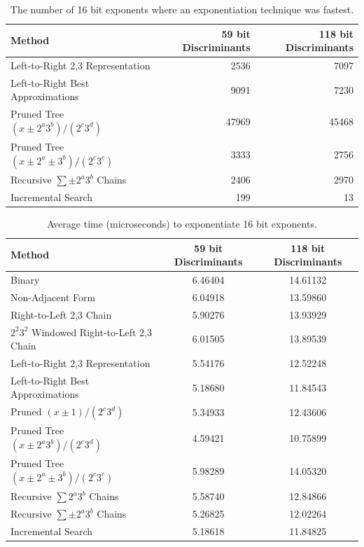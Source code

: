 \documentclass{ucalgthes1}
\theoremstyle{definition}
\begin{document}
\begin{table}[htb]
\centering
\begin{tabular}{| l | r | r |}
	\hline
	Method & 59 bit Discriminants & 118 bit Discriminants \\
	\hline
	Left-to-Right 2,3 Representation & 2536 & 7097 \\
	Left-to-Right Best Approximations & 9091 & 7230 \\
	Pruned Tree $(x \pm 2^a3^b)/(2^c3^d)$ & 47969 & 45468 \\
	Pruned Tree $(x \pm 2^a \pm 3^b)/(2^c3^c)$ & 3333 & 2756 \\
	Recursive $\sum \pm 2^a3^b$ Chains & 2406 & 2970 \\
	Incremental Search & 199 & 13 \\
	\hline
\end{tabular}
\caption[Best 16 bit exponentiation techniques.]{The number of 16 bit exponents where an exponentiation technique was fastest.}
\label{tab:exp16bitWinners}
\end{table}

\begin{table}[htb]
\centering
\begin{tabular}{| l | c | c |}
	\hline
	Method & 59 bit Discriminants & 118 bit Discriminants \\
	\hline
	Binary & 6.46404 & 14.61132 \\
	Non-Adjacent Form & 6.04918 & 13.59860 \\
	Right-to-Left 2,3 Chain & 5.90276 & 13.93929 \\
	$2^2 3^2$ Windowed Right-to-Left 2,3 Chain & 6.01505 & 13.89539 \\
	Left-to-Right 2,3 Representation & 5.54176 & 12.52248 \\
	Left-to-Right Best Approximations & 5.18680 & 11.84543 \\
	Pruned $(x \pm 1)/(2^c3^d)$ & 5.34933 & 12.43606 \\
	Pruned Tree $(x \pm 2^a3^b)/(2^c3^d)$ & 4.59421 & 10.75899 \\
	Pruned Tree $(x \pm 2^a \pm 3^b)/(2^c3^c)$ & 5.98289 & 14.05320 \\
	Recursive $\sum 2^a3^b$ Chains & 5.58740 & 12.84866 \\
	Recursive $\sum \pm 2^a3^b$ Chains & 5.26825 & 12.02264 \\
	Incremental Search & 5.18618 & 11.84825 \\
	\hline
\end{tabular}
\caption{Average time (microseconds) to exponentiate 16 bit exponents.}
\label{tab:exp16bitTimes}
\end{table}
\end{document}
